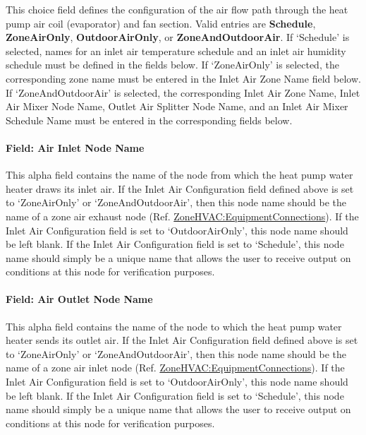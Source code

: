This choice field defines the configuration of the air flow path through the heat pump air coil (evaporator) and fan section. Valid entries are \textbf{Schedule}, \textbf{ZoneAirOnly}, \textbf{OutdoorAirOnly}, or \textbf{ZoneAndOutdoorAir}. If `Schedule' is selected, names for an inlet air temperature schedule and an inlet air humidity schedule must be defined in the fields below. If `ZoneAirOnly' is selected, the corresponding zone name must be entered in the Inlet Air Zone Name field below. If `ZoneAndOutdoorAir' is selected, the corresponding Inlet Air Zone Name, Inlet Air Mixer Node Name, Outlet Air Splitter Node Name, and an Inlet Air Mixer Schedule Name must be entered in the corresponding fields below.

\paragraph{Field: Air Inlet Node Name}\label{field-air-inlet-node-name-1-006}

This alpha field contains the name of the node from which the heat pump water heater draws its inlet air. If the Inlet Air Configuration field defined above is set to `ZoneAirOnly' or `ZoneAndOutdoorAir', then this node name should be the name of a zone air exhaust node (Ref. \hyperref[zonehvacequipmentconnections]{ZoneHVAC:EquipmentConnections}). If the Inlet Air Configuration field is set to `OutdoorAirOnly', this node name should be left blank. If the Inlet Air Configuration field is set to `Schedule', this node name should simply be a unique name that allows the user to receive output on conditions at this node for verification purposes.

\paragraph{Field: Air Outlet Node Name}\label{field-air-outlet-node-name-1-005}

This alpha field contains the name of the node to which the heat pump water heater sends its outlet air. If the Inlet Air Configuration field defined above is set to `ZoneAirOnly' or `ZoneAndOutdoorAir', then this node name should be the name of a zone air inlet node (Ref. \hyperref[zonehvacequipmentconnections]{ZoneHVAC:EquipmentConnections}). If the Inlet Air Configuration field is set to `OutdoorAirOnly', this node name should be left blank. If the Inlet Air Configuration field is set to `Schedule', this node name should simply be a unique name that allows the user to receive output on conditions at this node for verification purposes.

